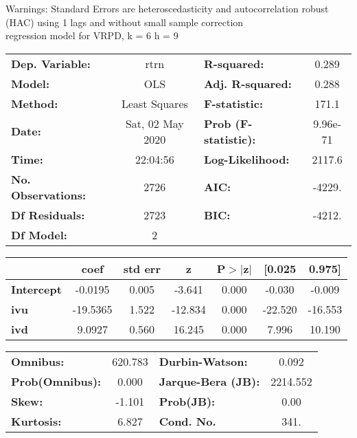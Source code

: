 Warnings: \newline
 [1] Standard Errors are heteroscedasticity and autocorrelation robust (HAC) using 1 lags and without small sample correction\\ 

regression model for VRPD, k = 6 h = 9\begin{center}
\begin{tabular}{lclc}
\toprule
\textbf{Dep. Variable:}    &       rtrn       & \textbf{  R-squared:         } &     0.289   \\
\textbf{Model:}            &       OLS        & \textbf{  Adj. R-squared:    } &     0.288   \\
\textbf{Method:}           &  Least Squares   & \textbf{  F-statistic:       } &     171.1   \\
\textbf{Date:}             & Sat, 02 May 2020 & \textbf{  Prob (F-statistic):} &  9.96e-71   \\
\textbf{Time:}             &     22:04:56     & \textbf{  Log-Likelihood:    } &    2117.6   \\
\textbf{No. Observations:} &        2726      & \textbf{  AIC:               } &    -4229.   \\
\textbf{Df Residuals:}     &        2723      & \textbf{  BIC:               } &    -4212.   \\
\textbf{Df Model:}         &           2      & \textbf{                     } &             \\
\bottomrule
\end{tabular}
\begin{tabular}{lcccccc}
                   & \textbf{coef} & \textbf{std err} & \textbf{z} & \textbf{P$> |$z$|$} & \textbf{[0.025} & \textbf{0.975]}  \\
\midrule
\textbf{Intercept} &      -0.0195  &        0.005     &    -3.641  &         0.000        &       -0.030    &       -0.009     \\
\textbf{ivu}       &     -19.5365  &        1.522     &   -12.834  &         0.000        &      -22.520    &      -16.553     \\
\textbf{ivd}       &       9.0927  &        0.560     &    16.245  &         0.000        &        7.996    &       10.190     \\
\bottomrule
\end{tabular}
\begin{tabular}{lclc}
\textbf{Omnibus:}       & 620.783 & \textbf{  Durbin-Watson:     } &    0.092  \\
\textbf{Prob(Omnibus):} &   0.000 & \textbf{  Jarque-Bera (JB):  } & 2214.552  \\
\textbf{Skew:}          &  -1.101 & \textbf{  Prob(JB):          } &     0.00  \\
\textbf{Kurtosis:}      &   6.827 & \textbf{  Cond. No.          } &     341.  \\
\bottomrule
\end{tabular}
\end{center}

